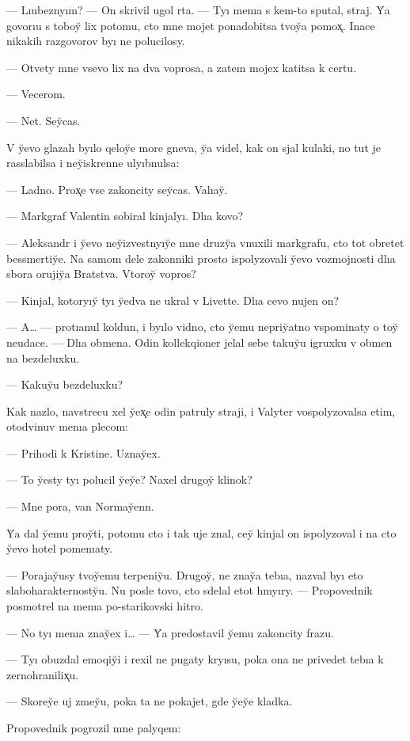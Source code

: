 \documentclass[10pt]{book}
\begin{document}
— Lıubeznyım? — On skrivil ugol rta. — Tyı menıa s kem-to sputal, straj. Y̆a govorıu s toboy̆ lix potomu, cto mne mojet ponadobitsa tvoy̆a pomox̨. Inace nikakih razgovorov byı ne polucilosy.

— Otvety mne vsevo lix na dva voprosa, a zatem mojex katitsa k certu.

— Vecerom.

— Net. Sey̆cas.

V y̆evo glazah byılo qeloy̆e more gneva, y̆a videl, kak on sjal kulaki, no tut je rasslabilsa i ney̆iskrenne ulyıbnulsa:

— Ladno. Prox̨e vse zakoncity sey̆cas. Valıay̆.

— Markgraf Valentin sobiral kinjalyı. Dlıa kovo?

— Aleksandr i y̆evo ney̆izvestnyıy̆e mne druzy̆a vnuxili markgrafu, cto tot obretet bessmertiy̆e. Na samom dele zakonniki prosto ispolyzovali y̆evo vozmojnosti dlıa sbora orujiy̆a Bratstva. Vtoroy̆ vopros?

— Kinjal, kotoryıy̆ tyı y̆edva ne ukral v Livette. Dlıa cevo nujen on?

— A… — protıanul koldun, i byılo vidno, cto y̆emu nepriy̆atno vspominaty o toy̆ neudace. — Dlıa obmena. Odin kollekqioner jelal sebe takuy̆u igruxku v obmen na bezdeluxku.

— Kakuy̆u bezdeluxku?

Kak nazlo, navstrecu xel y̆ex̨e odin patruly straji, i Valyter vospolyzovalsa etim, otodvinuv menıa plecom:

— Prihodi k Kristine. Uznay̆ex.

— To y̆esty tyı polucil y̆ey̆e? Naxel drugoy̆ klinok?

— Mne pora, van Normay̆enn.

Y̆a dal y̆emu proy̆ti, potomu cto i tak uje znal, cey̆ kinjal on ispolyzoval i na cto y̆evo hotel pomenıaty.



— Porajay̆usy tvoy̆emu terpeniy̆u. Drugoy̆, ne znay̆a tebıa, nazval byı eto slaboharakternosty̆u. Nu posle tovo, cto sdelal etot hmyıry. — Propovednik posmotrel na menıa po-starikovski hitro.

— No tyı menıa znay̆ex i… — Y̆a predostavil y̆emu zakoncity frazu.

— Tyı obuzdal emoqiy̆i i rexil ne pugaty kryısu, poka ona ne privedet tebıa k zernohranilix̨u.

— Skorey̆e uj zmey̆u, poka ta ne pokajet, gde y̆ey̆e kladka.

Propovednik pogrozil mne palyqem:
\end{document}

